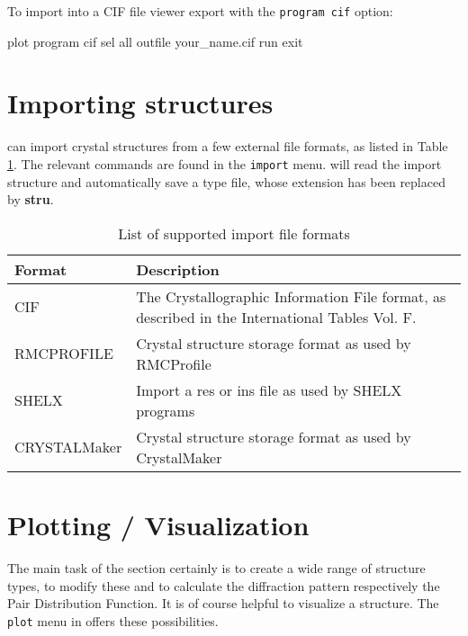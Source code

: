 To import into a CIF file viewer export with the {\tt program cif}
option:

\begin{MacVerbatim}
  plot
    program cif
    sel     all
    outfile your_name.cif
    run
  exit
\end{MacVerbatim}


\section{Importing structures \label{struc-import}}

\Discus can import crystal structures from a few external file formats, 
as listed
in Table \ref{struc-imp-tab1}. The relevant commands are found in the 
{\tt import} menu. \Discus will read the import structure and automatically
save a \Discus type file, whose extension has been replaced by {\bf stru}.

\begin{table}[!tbh]
\centering
\begin{tabularx}{\textwidth}{|p{30mm}|X|}
  \hline
  {\bf Format } & {\bf Description} \\
  \hline\hline
  CIF         & The Crystallographic Information File format, as    
                described in the International Tables 
                \cite{tables} Vol. F.\\
  \hline
  RMCPROFILE  & Crystal structure storage format as used by RMCProfile\\
  \hline
  SHELX & Import a res or ins file as used by SHELX programs \\
  \hline
  CRYSTALMaker & Crystal structure storage format as used by CrystalMaker \\
  \hline
\end{tabularx}
\caption{\label{struc-imp-tab1} List of supported import file formats}
\end{table}


\section{Plotting / Visualization \label{struc-plot}}

The main task of the \Discus section certainly is to create a wide 
range of structure types, to modify these and to calculate the diffraction
pattern respectively the Pair Distribution Function. It is of course 
helpful to visualize a structure. The {\tt plot} menu in \Discus offers
these possibilities. 

